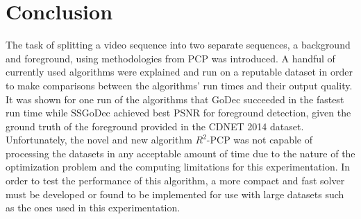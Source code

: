 \documentclass[conference]{IEEEtran}
\begin{document}
\section{Conclusion}
The task of splitting a video sequence into two separate sequences, a background and foreground, using methodologies from PCP was introduced. A handful of currently used algorithms were explained and run on a reputable dataset in order to make comparisons between the algorithms' run times and their output quality. It was shown for one run of the algorithms that GoDec succeeded in the fastest run time while SSGoDec  achieved best PSNR for foreground detection, given the ground truth of the foreground provided in the CDNET 2014 dataset. Unfortunately, the novel and new algorithm $R^2$-PCP was not capable of processing the datasets in any acceptable amount of time due to the nature of the optimization problem and the computing limitations for this experimentation. In order to test the performance of this algorithm, a more compact and fast solver must be developed or found to be implemented for use with large datasets such as the ones used in this experimentation.

\newpage


\end{document}

